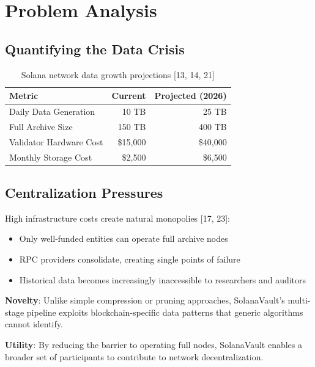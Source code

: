 \documentclass[12pt,a4paper]{article}
\begin{document}
\section{Problem Analysis}

\subsection{Quantifying the Data Crisis}

\begin{table}[h]
\centering
\begin{tabular}{@{}lrr@{}}
\toprule
\textbf{Metric} & \textbf{Current} & \textbf{Projected (2026)} \\
\midrule
Daily Data Generation & 10 TB & 25 TB \\
Full Archive Size & 150 TB & 400 TB \\
Validator Hardware Cost & \$15,000 & \$40,000 \\
Monthly Storage Cost & \$2,500 & \$6,500 \\
\bottomrule
\end{tabular}
\caption{Solana network data growth projections [13, 14, 21]}
\end{table}

\subsection{Centralization Pressures}

High infrastructure costs create natural monopolies [17, 23]:
\begin{itemize}
    \item Only well-funded entities can operate full archive nodes
    \item RPC providers consolidate, creating single points of failure
    \item Historical data becomes increasingly inaccessible to researchers and auditors
\end{itemize}

\noindent\textbf{Novelty}: Unlike simple compression or pruning approaches, SolanaVault's multi-stage pipeline exploits blockchain-specific data patterns that generic algorithms cannot identify.

\noindent\textbf{Utility}: By reducing the barrier to operating full nodes, SolanaVault enables a broader set of participants to contribute to network decentralization.
\end{document}
